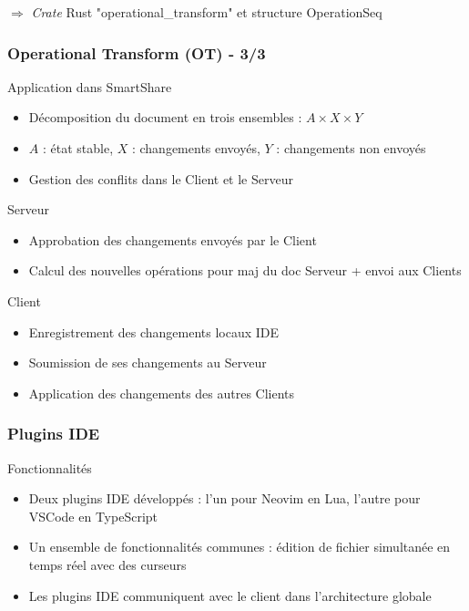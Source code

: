 \documentclass{beamer}
\begin{document}
\begin{frame}
    $\Rightarrow$ \textit{Crate} Rust "operational\_transform" et structure OperationSeq

\end{frame}

\begin{frame}
    \frametitle{Operational Transform (OT) - 3/3}
    \begin{block}{Application dans SmartShare}
        \begin{itemize}
            \item Décomposition du document en trois ensembles : $A \times X \times Y$
            \item $A$ : état stable, $X$ : changements envoyés, $Y$ : changements non envoyés
            \item Gestion des conflits dans le Client et le Serveur
        \end{itemize}
    \end{block}

    \begin{block}{Serveur}
        \begin{itemize}
            \item Approbation des changements envoyés par le Client
            \item Calcul des nouvelles opérations pour maj du doc Serveur + envoi aux Clients
        \end{itemize}
    \end{block}

    \begin{block}{Client}
        \begin{itemize}
            \item Enregistrement des changements locaux IDE
            \item Soumission de ses changements au Serveur
            \item Application des changements des autres Clients
        \end{itemize}
    \end{block}
\end{frame}

\begin{frame}
    \frametitle{Plugins IDE}
    \begin{block}{Fonctionnalités}
        \begin{itemize}
            \item Deux plugins IDE développés : l'un pour Neovim en Lua, l'autre pour VSCode en TypeScript
            \item Un ensemble de fonctionnalités communes : édition de fichier simultanée en temps réel avec des curseurs
            \item Les plugins IDE communiquent avec le client dans l'architecture globale
        \end{itemize}
    \end{block}
\end{frame}
\end{document}
